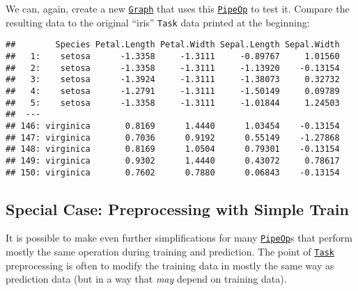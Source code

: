 \documentclass[
]{scrbook}
\newenvironment{Shaded}{\begin{snugshade}}{\end{snugshade}}
\newcommand{\DecValTok}[1]{\textcolor[rgb]{0.00,0.00,0.81}{#1}}
\newcommand{\FunctionTok}[1]{\textcolor[rgb]{0.00,0.00,0.00}{#1}}
\newcommand{\NormalTok}[1]{#1}
\newcommand{\OtherTok}[1]{\textcolor[rgb]{0.56,0.35,0.01}{#1}}
\newcommand{\SpecialCharTok}[1]{\textcolor[rgb]{0.00,0.00,0.00}{#1}}
\renewenvironment{Shaded} {\begin{snugshade}\small} {\end{snugshade}}
\begin{document}
We can, again, create a new \href{https://mlr3pipelines.mlr-org.com/reference/Graph.html}{\texttt{Graph}} that uses this \href{https://mlr3pipelines.mlr-org.com/reference/PipeOp.html}{\texttt{PipeOp}} to test it.
Compare the resulting data to the original ``iris'' \texttt{Task} data printed at the beginning:

\begin{Shaded}
\end{Shaded}

\begin{verbatim}
##        Species Petal.Length Petal.Width Sepal.Length Sepal.Width
##   1:    setosa      -1.3358     -1.3111     -0.89767     1.01560
##   2:    setosa      -1.3358     -1.3111     -1.13920    -0.13154
##   3:    setosa      -1.3924     -1.3111     -1.38073     0.32732
##   4:    setosa      -1.2791     -1.3111     -1.50149     0.09789
##   5:    setosa      -1.3358     -1.3111     -1.01844     1.24503
##  ---                                                            
## 146: virginica       0.8169      1.4440      1.03454    -0.13154
## 147: virginica       0.7036      0.9192      0.55149    -1.27868
## 148: virginica       0.8169      1.0504      0.79301    -0.13154
## 149: virginica       0.9302      1.4440      0.43072     0.78617
## 150: virginica       0.7602      0.7880      0.06843    -0.13154
\end{verbatim}

\hypertarget{special-case-preprocessing-with-simple-train}{%
\subsection{Special Case: Preprocessing with Simple Train}\label{special-case-preprocessing-with-simple-train}}

It is possible to make even further simplifications for many \href{https://mlr3pipelines.mlr-org.com/reference/PipeOp.html}{\texttt{PipeOp}}s that perform mostly the same operation during training and prediction.
The point of \href{https://mlr3.mlr-org.com/reference/Task.html}{\texttt{Task}} preprocessing is often to modify the training data in mostly the same way as prediction data (but in a way that \emph{may} depend on training data).
\end{document}
